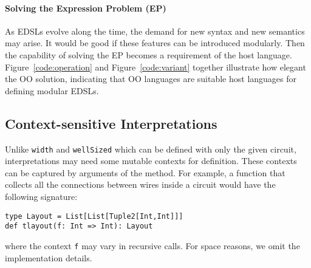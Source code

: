 \paragraph{Solving the Expression Problem (EP)} As EDSLs evolve along the time, the
demand for new syntax and new semantics may arise. It would be good if
these features can be introduced modularly. Then the capability of solving the EP
becomes a requirement of the host language.
Figure~\ref{code:operation} and Figure~\ref{code:variant} together illustrate
how elegant the OO solution,
indicating that OO languages are suitable host languages for defining modular EDSLs.

\subsection{Context-sensitive Interpretations}
Unlike \lstinline{width} and \lstinline{wellSized} which can be defined with
only the given circuit, interpretations may need some mutable contexts for definition.
These contexts can be captured by arguments of the method. For example, a
function that collects all the connections between wires inside a circuit would have
the following signature:
\begin{lstlisting}
type Layout = List[List[Tuple2[Int,Int]]]
def tlayout(f: Int => Int): Layout
\end{lstlisting}
where the context \lstinline{f} may vary in recursive calls.
For space reasons, we omit the implementation details.